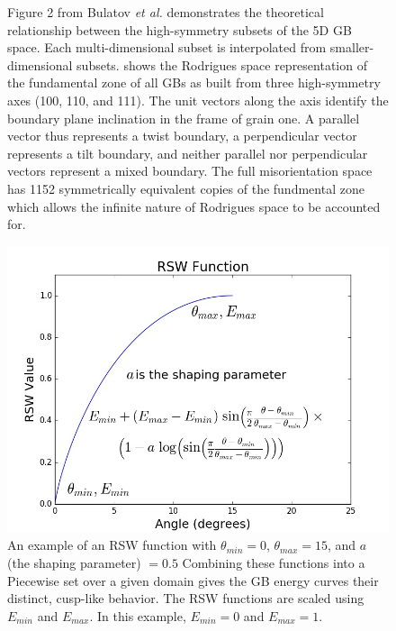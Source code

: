 \documentclass[12pt]{report}
\begin{document}
\begin{figure}[ht!]
 \caption[Theoretical relationship between high-symmetry subsets and fundamental zone.]{\label{fig:bulatovFig2}Figure 2 from Bulatov \emph{et al.}\cite{bulatov2014} \protect{} demonstrates the theoretical relationship between the high-symmetry subsets of the 5D GB space.  Each multi-dimensional subset is interpolated from smaller-dimensional subsets. \protect{} shows the Rodrigues space representation of the fundamental zone of all GBs as built from three high-symmetry axes (\textlangle{}100\textrangle{}, \textlangle{}110\textrangle{}, and \textlangle{}111\textrangle{}).  The unit vectors along the axis identify the boundary plane inclination in the frame of grain one.  A parallel vector thus represents a twist boundary, a perpendicular vector represents a tilt boundary, and neither parallel nor perpendicular vectors represent a mixed boundary.  The full misorientation space has 1152 symmetrically equivalent copies of the fundmental zone\cite{bulatov2014,randle2000} which allows the infinite nature of Rodrigues space to be accounted for.}
\end{figure}

\begin{figure}[ht!]
 \centering
 \includegraphics[scale=0.5]{Images/rsw}
 \caption[General form of an RSW function.]{\label{fig:RSW}An example of an RSW function with $\theta_{min} = 0$\textdegree{}, $\theta_{max} = 15$\textdegree{}, and $a$ (the shaping parameter) $= 0.5$  Combining these functions into a Piecewise set over a given domain gives the GB energy curves their distinct, cusp-like behavior.  The RSW functions are scaled using $E_{min}$ and $E_{max}$.  In this example, $E_{min} = 0$ and $E_{max} = 1$.}
\end{figure}
\end{document}
